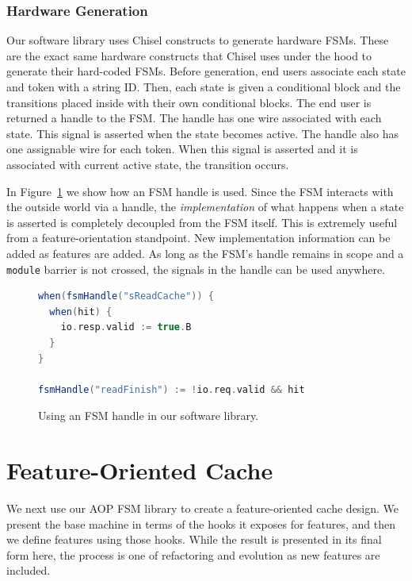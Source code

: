 \documentclass[conference]{IEEEtran}
\begin{document}
\subsubsection{Hardware Generation}
Our software library uses Chisel constructs to generate hardware FSMs. These are the exact same hardware constructs that Chisel uses under the hood to generate their hard-coded FSMs. Before generation, end users associate each state and token with a string ID. Then, each state is given a conditional block and the transitions placed inside with their own conditional blocks. The end user is returned a handle to the FSM. The handle has one wire associated with each state. This signal is asserted when the state becomes active. The handle also has one assignable wire for each token. When this signal is asserted and it is associated with current active state, the transition occurs.

In Figure~\ref{fig:handle} we show how an FSM handle is used. Since the FSM interacts with the outside world via a handle, the \emph{implementation} of what happens when a state is asserted is completely decoupled from the FSM itself. This is extremely useful from a feature-orientation standpoint. New implementation information can be added as features are added. As long as the FSM's handle remains in scope and a \texttt{module} barrier is not crossed, the signals in the handle can be used anywhere. 

\begin{figure}[ht]
    \centering
    \begin{lstlisting}[language = Scala]
when(fsmHandle("sReadCache")) {
  when(hit) {
    io.resp.valid := true.B
  }
}

fsmHandle("readFinish") := !io.req.valid && hit
    \end{lstlisting}
    \caption{Using an FSM handle in our software library.}
    \label{fig:handle}
\end{figure}

\section{Feature-Oriented Cache}\label{sec:foc}
We next use our AOP FSM library to create a feature-oriented cache design.  We present the base machine in terms of the hooks it exposes for features, and then we define features using those hooks.  While the result is presented in its final form here, the process is one of refactoring and evolution as new features are included.
\end{document}
